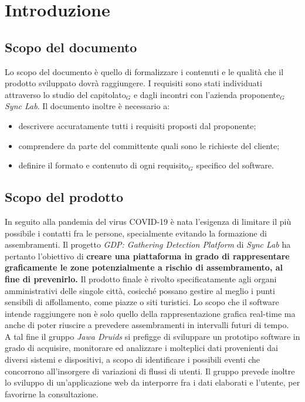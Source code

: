 \chapter{Introduzione}\label{Introduzione}

\section{Scopo del documento}\label{introduzioneScopoDelDocumento}
Lo scopo del documento è quello di formalizzare i contenuti e le qualità che il prodotto sviluppato dovrà raggiungere.
I requisiti sono stati individuati attraverso lo studio del capitolato$_G$ e dagli incontri con l'azienda proponente$_G$ \textit{Sync Lab}.
Il documento inoltre è necessario a:
\begin{itemize}
	\item descrivere accuratamente tutti i requisiti proposti dal proponente;
	\item comprendere da parte del committente quali sono le richieste del cliente;
	\item definire il formato e contenuto di ogni requisito$_G$ specifico del software.
\end{itemize}
\section{Scopo del prodotto}\label{introduzioneScopodelProdotto}
In seguito alla pandemia del virus COVID-19 è nata l'esigenza di limitare il più possibile i
contatti fra le persone, specialmente evitando la formazione di assembramenti.
Il progetto \textit{GDP: Gathering Detection Platform} di \textit{Sync Lab} ha pertanto l'obiettivo di \textbf{creare una piattaforma in grado di rappresentare graficamente le zone potenzialmente a rischio di assembramento, al fine di prevenirlo.} Il prodotto finale è rivolto specificatamente agli
organi amministrativi delle singole città, cosicché possano gestire al meglio i punti sensibili di affollamento, come piazze o siti turistici. Lo scopo che il software intende raggiungere non è
solo quello della rappresentazione grafica real-time ma anche di poter riuscire a prevedere
assembramenti in intervalli futuri di tempo.
\\
A tal fine il gruppo \textit{Jawa Druids} si prefigge di sviluppare un prototipo software in grado di acquisire, monitorare ed analizzare i molteplici dati provenienti dai diversi sistemi e dispositivi, a scopo di identificare i possibili eventi che concorrono all'insorgere di variazioni di flussi di utenti. Il gruppo prevede inoltre lo sviluppo di un'applicazione web da interporre fra i dati elaborati e l'utente, per favorirne la consultazione.
